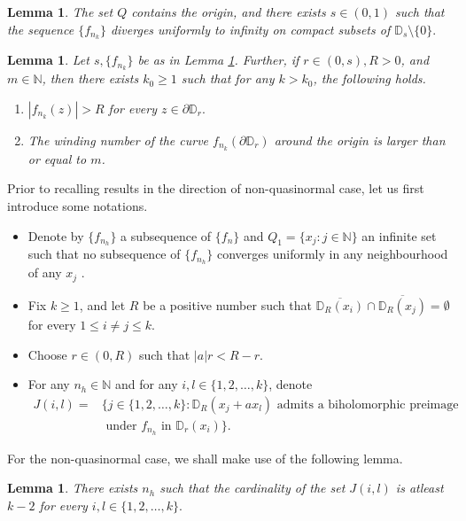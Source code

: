 \documentclass[12pt, reqno]{amsart}
\numberwithin{equation}{section}
\theoremstyle{definition}
\theoremstyle{remark}
\theoremstyle{plain}
\newtheorem{lemma}[theorem]{Lemma}
\theoremstyle{definition}
\numberwithin{equation}{section}
\begin{document}
\begin{lemma}\label{2.3}
The set $Q$ contains the origin, and there exists $s\in (0,1)$ such  that the sequence $\{f_{n_k}\}$  diverges uniformly to infinity  on compact subsets of $\mathbb{D}_s\setminus\{0\}.$
\end{lemma}
\begin{lemma}\label{2.6}
Let $s, \{f_{n_k}\}$ be as in Lemma \ref{2.3}. Further, if $r\in (0,s), R>0$, and $m\in\mathbb{N}$, then there exists $k_0\geq 1$ such that for any $k>k_0$, the following holds.
\begin{enumerate}
\item $|f_{n_k}(z)|>R$ for every $z\in\partial\mathbb{D}_r.$
\item The winding number of the curve $f_{n_k}(\partial\mathbb{D}_r)$ around the origin is larger than or equal to $m$.
\end{enumerate}
\end{lemma}

Prior to recalling results in the direction of non-quasinormal case, let us first introduce some notations.
\begin{itemize}
\item[(i)] Denote by $\{f_{n_h}\}$ a subsequence of $\{f_n\}$ and $Q_1=\{x_j: j\in\mathbb{N}\}$ an infinite set such that no subsequence of $\{f_{n_h}\}$ converges uniformly in any neighbourhood of any $x_j$ \cite[Proposition 2.9]{Arosio3}. 
\item[(ii)] Fix $k\geq 1$, and let $R$ be a positive number such that $\overline{\mathbb{D}_R(x_i)}\cap \overline{\mathbb{D}_R(x_j)}=\emptyset$ for every $1\leq i\not=j\leq k.$
\item[(iii)] Choose $r\in (0,R)$ such that $|a|r<R-r.$
\item[(iv)] For any $n_h\in\mathbb{N}$ and for any $i,l\in\{1,2,\dots,k\}$, denote
\begin{align*}\label{iv}
J(i,l)=&\{j\in\{1,2,\dots,k\}: \mathbb{D}_R(x_j+ax_l)\text{ admits a biholomorphic preimage}\\
&\text{ under }f_{n_h} \text{ in }
 \mathbb{D}_r(x_i)\}.
\end{align*} 
\end{itemize}

For the non-quasinormal case, we shall make use of the following lemma.
\begin{lemma}\cite[Lemma 3.10]{Arosio3}\label{3.1}
There exists $n_h$ such that the cardinality of the set $J(i,l)$ is atleast $k-2$ for every $i,l\in\{1,2,\dots,k\}.$
\end{lemma}
\end{document}
